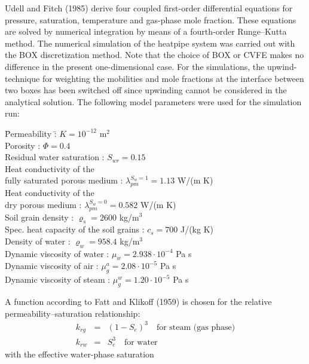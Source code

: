 Udell and Fitch (1985) \cite{Udell:1985} derive four
coupled first-order differential equations for pressure, saturation,
temperature and gas-phase mole fraction. These equations are solved
by numerical integration by means of a fourth-order Runge--Kutta method. 
The numerical simulation of the heatpipe system was carried out
with the BOX discretization method. Note that the choice of
BOX or CVFE makes no difference in the present one-dimensional
case. For the simulations, the upwind-technique for weighting the
mobilities and mole fractions at the interface between two boxes
has been switched off since upwinding cannot be considered in the
analytical solution.
The following model parameters were used for the simulation run:
\begin{tabbing}
\hspace{0.5cm} \=
Permeability \hspace{4.5cm} \= : $K=10^{-12}$ m$^2$ \\
\> Porosity \> : $\Phi=0.4$\\
\> Residual water saturation          \> : $ S_{wr}=0.15$\\
\> Heat conductivity of the \\
\> fully saturated porous medium \> : $\lambda_{pm}^{S_w=1}=1.13$
W/(m K) \\
\> Heat conductivity of the \\
\> dry porous medium                \> : $\lambda_{pm}^{S_w=0}=0.582$
W/(m K) \\
\> Soil grain density            \> : $\varrho_s =2600$ kg/m$^3$\\
\> Spec. heat capacity of the soil grains  \> : $c_s =700$ J/(kg K) \\
\> Density of water \> : $\varrho_w = 958.4$ kg/m$^3$ \\
\> Dynamic viscosity of water \> : $\mu_w = 2.938 \cdot 10^{-4}$ Pa s\\
\> Dynamic viscosity of air \> : $\mu_g^a = 2.08 \cdot 10^{-5}$ Pa s\\
\> Dynamic viscosity of steam \> : $\mu_g^w = 1.20 \cdot 10^{-5}$ Pa s
\end{tabbing}
A function according to Fatt and Klikoff (1959) \cite{Fatt:1959} is 
chosen for the relative permeability--saturation relationship:
\begin{eqnarray}
k_{rg} &=& (1 - S_e)^3 \quad \mbox{for steam (gas phase)} \nonumber \\
k_{rw} &=& S_e^3 \quad \mbox{for water} \, 
\end{eqnarray}
with the effective water-phase saturation
